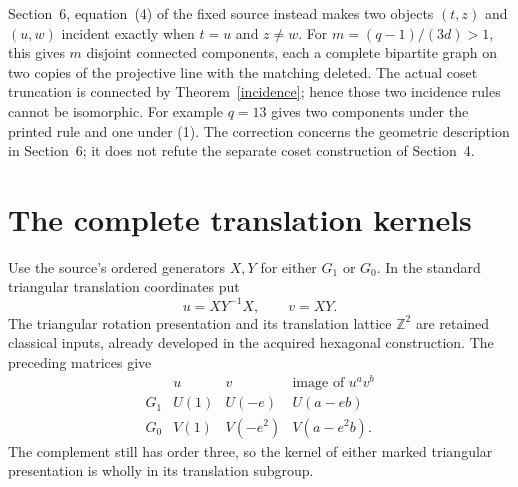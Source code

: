 \documentclass[11pt,a4paper]{article}
\newcommand{\Z}{\mathbb Z}
\begin{document}
Section~6, equation~(4) of the fixed source instead makes two
objects $(t,z)$ and $(u,w)$ incident exactly when $t=u$ and
$z\ne w$. For $m=(q-1)/(3d)>1$, this gives $m$ disjoint connected
components, each a complete bipartite graph on two copies of the
projective line with the matching deleted. The actual coset
truncation is connected by Theorem~\ref{incidence}; hence those
two incidence rules cannot be isomorphic. For example $q=13$
gives two components under the printed rule and one under (1).
The correction concerns the geometric description in Section~6;
it does not refute the separate coset construction of Section~4.



\section{The complete translation kernels}

Use the source's ordered generators $X,Y$ for either $G_1$ or
$G_0$. In the standard triangular translation coordinates put
\[
                        u=XY^{-1}X,\qquad v=XY.
\]
The triangular rotation presentation and its translation lattice
$\Z^2$ are retained classical inputs, already developed in the
acquired hexagonal construction. The preceding matrices give
\[
\begin{array}{c|cc|c}
 &u&v&\text{image of }u^a v^b\\\hline
 G_1&U(1)&U(-e)&U(a-eb)\\
 G_0&V(1)&V(-e^2)&V(a-e^2b).
\end{array}                                                   \tag{4}
\]
The complement still has order three, so the kernel of either
marked triangular presentation is wholly in its translation subgroup.
\end{document}
